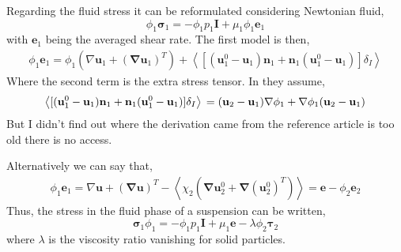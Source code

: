 \documentclass[12pt]{My_preprint}
\newcommand{\avg}[1]{\left<#1\right>}
\renewcommand{\avg}[1]{\left<#1\right>}
\newcommand{\grad}{\mathbf{\nabla}}
\begin{document}
Regarding the fluid stress it can be reformulated considering Newtonian fluid,
\begin{equation}
    \phi_1 \bm{\sigma}_1 
    = - \phi_1 p_1 \textbf{I}
    + \mu_1 \phi_1 \textbf{e}_1
\end{equation}
with $\textbf{e}_1$ being the averaged shear rate. 
The first model is then, 
\begin{align*}
    \phi_1 \textbf{e}_1
    = \phi_1 (\nabla \textbf{u}_1+ (\grad \textbf{u}_1)^T)
    + \avg{[(\textbf{u}_1^0 - \textbf{u}_1)  \textbf{n}_1 
    +  \textbf{n}_1(\textbf{u}_1^0 - \textbf{u}_1 )]\delta_I}
\end{align*}
Where the second term is the extra stress tensor. 
In \citet[chap 9]{ishii2010thermo} they assume,
\begin{equation}
    \avg{[(\textbf{u}_1^0 - \textbf{u}_1)  \textbf{n}_1 +  \textbf{n}_1(\textbf{u}_1^0 - \textbf{u}_1 )]\delta_I}\\
    = 
    (\textbf{u}_2 - \textbf{u}_1)  \grad \phi_1 +  \grad \phi_1(\textbf{u}_2 - \textbf{u}_1 )\\
\end{equation}
But I didn't find out where the derivation came from the reference article is too old there is no access.  

Alternatively we can say that, 
\begin{align*}
    \phi_1 \textbf{e}_1
    = \nabla \textbf{u}+ (\grad \textbf{u})^T
    - \avg{\chi_2 (\grad\textbf{u}_2^0 + \grad(\textbf{u}_2^0 )^T)}
    = \textbf{e}
    - \phi_2 \textbf{e}_2
\end{align*}
Thus, the stress in the fluid phase of a suspension can be written,
\begin{equation}
    \bm{\sigma}_1 \phi_1
    =- \phi_1 p_1 \textbf{I}
    + \mu_1 \textbf{e}
    - \lambda \phi_2 \bm{\tau}_2
    \label{eq:sigma1}
\end{equation}
where $\lambda$ is the viscosity ratio vanishing for solid particles. 
\end{document}
